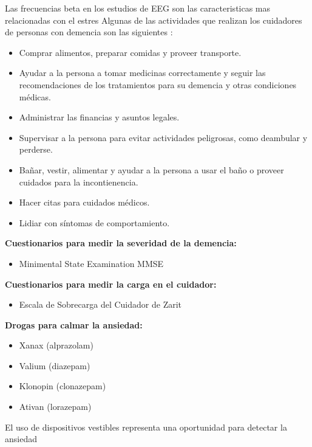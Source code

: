 \documentclass[letterpaper,12pt]{cicese}
\begin{document}
		Las frecuencias beta en los estudios de EEG son las caracteristicas mas relacionadas con el estres \citep{Sharma20121287}
		Algunas de las actividades que realizan los cuidadores de personas con demencia son las siguientes \citep{tagkey2008110}: 
		\begin{itemize}
			\item Comprar alimentos, preparar comidas y proveer transporte.
			\item Ayudar a la persona a tomar medicinas correctamente y seguir las recomendaciones de los tratamientos para su demencia y otras condiciones m\'edicas.
			\item Administrar las financias y asuntos legales.
			\item Supervisar a la persona para evitar actividades peligrosas, como deambular y perderse.	
			\item Ba\~nar, vestir, alimentar y ayudar a la persona a usar el ba\~no o proveer cuidados para la incontienencia.
			\item Hacer citas para cuidados m\'edicos.
			\item Lidiar con s\'intomas de comportamiento.

		\end{itemize}
		\textbf{Cuestionarios para medir la severidad de la demencia:}
		\begin{itemize}

			\item Minimental State Examination MMSE

		\end{itemize}
		\textbf{Cuestionarios para medir la carga en el cuidador:}
		\begin{itemize}

			\item Escala de Sobrecarga del Cuidador de Zarit

		\end{itemize}
		\textbf{Drogas para calmar la ansiedad:}
		\begin{itemize}
			\item Xanax (alprazolam)
			\item Valium (diazepam)
			\item Klonopin (clonazepam)
			\item Ativan (lorazepam)
		\end{itemize}

	El uso de dispositivos vestibles representa una oportunidad para detectar la ansiedad \citep{Miranda:2014:ADU:2676690.2676694}
	
\end{document}
